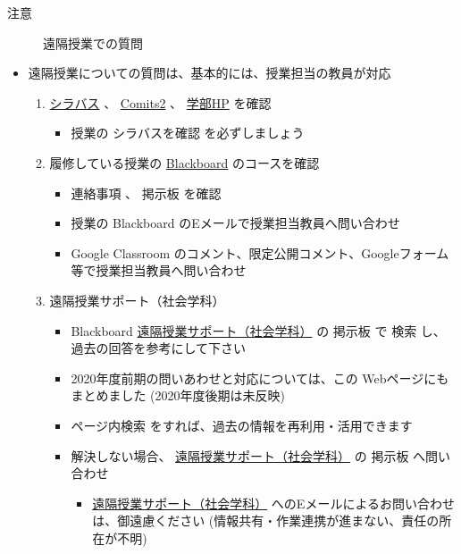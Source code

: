 \documentclass[a4j,10pt]{jsarticle}
\begin{document}
{\begin{frame}
\begin{block}{注意}
\begin{figure}[htbp]
\caption{
遠隔授業での質問}
\end{figure}
\par
\begin{itemize}
\item 遠隔授業についての質問は、基本的には、授業担当の教員が対応
\begin{enumerate}
\item \href{https://syllabus.chs.nihon-u.ac.jp/}{シラバス} 、 \href{https://comits2.educ.chs.nihon-u.ac.jp/uniprove\_pt/UnLoginAction}{Comits2} 、 \href{https://www.chs.nihon-u.ac.jp/}{学部HP} を確認
\begin{itemize}
\item 授業の \alert{シラバスを確認} を必ずしましょう
\end{itemize}
\par
\item 履修している授業の \href{https://nuchs.blackboard.com/}{Blackboard} のコースを確認
\begin{itemize}
\item \alert{連絡事項} 、 \alert{掲示板} を確認
\item 授業の Blackboard のEメールで授業担当教員へ問い合わせ
\item Google Classroom のコメント、限定公開コメント、Googleフォーム等で授業担当教員へ問い合わせ
\end{itemize}
\par
\item 遠隔授業サポート（社会学科）
\begin{itemize}
\item Blackboard \href{https://nuchs.blackboard.com/webapps/blackboard/execute/modulepage/view?course\_id=\_2302\_1\&cmp\_tab\_id=\_4690\_1\&mode=view}{遠隔授業サポート（社会学科）} の \alert{掲示板} で \alert{検索} し、過去の回答を参考にして下さい
\item 2020年度前期の問いあわせと対応については、この Webページにもまとめました (2020年度後期は未反映)
\item \alert{ページ内検索} をすれば、過去の情報を再利用・活用できます
\item 解決しない場合、 \href{https://nuchs.blackboard.com/webapps/blackboard/execute/modulepage/view?course\_id=\_2302\_1\&cmp\_tab\_id=\_4690\_1\&mode=view}{遠隔授業サポート（社会学科）} の \alert{掲示板} へ問い合わせ
\begin{itemize}
\item \href{https://nuchs.blackboard.com/webapps/blackboard/execute/modulepage/view?course\_id=\_2302\_1\&cmp\_tab\_id=\_4690\_1\&mode=view}{遠隔授業サポート（社会学科）} へのEメールによるお問い合わせは、御遠慮ください (情報共有・作業連携が進まない、責任の所在が不明)

\end{itemize}
\end{itemize}
\end{enumerate}
\end{itemize}
\end{block}
\end{frame}}
\end{document}
